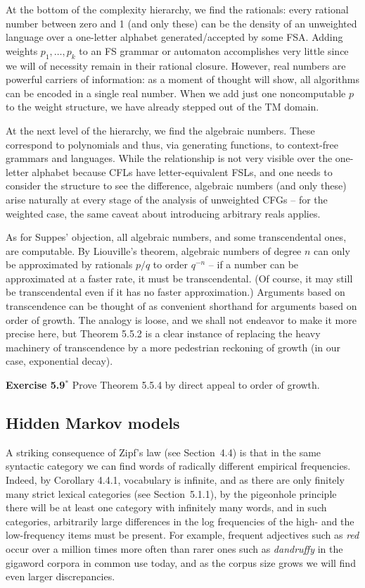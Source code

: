 At the bottom of the complexity hierarchy, we find the rationals: every
rational number between zero and 1 (and only these) can be the density of an
unweighted language over a one-letter alphabet generated/accepted by some
FSA. Adding weights $p_1, \ldots, p_k$ to an FS grammar or automaton
accomplishes very little since we will of necessity remain in their rational
closure. However, real numbers are powerful carriers of information: as a
moment of thought will show, all algorithms can be encoded in a single real
number. When we add just one noncomputable $p$ to the weight structure, we
have already stepped out of the TM domain.

At the next level of the hierarchy, we find the algebraic numbers. These
correspond to polynomials and thus, via generating functions, to context-free
grammars and languages. While the relationship is not very visible over the
one-letter alphabet because CFLs have letter-equivalent FSLs, and one needs
to consider the structure to see the difference, algebraic numbers (and only
these) arise naturally at every stage of the analysis of unweighted CFGs --
for the weighted case, the same caveat about introducing arbitrary reals
applies. 

As for Suppes' objection, all algebraic numbers, and some transcendental ones,
are computable. By Liouville's theorem, algebraic numbers of degree $n$ can
only be approximated by rationals $p/q$ to order $q^{-n}$ -- if a number can
be approximated at a faster rate, it must be transcendental. (Of course, it may
still be transcendental even if it has no faster approximation.) Arguments
based on transcendence can be thought of as convenient shorthand for arguments
based on order of growth. The analogy is loose, and we shall not endeavor to
make it more precise here, but Theorem 5.5.2 is a clear instance of replacing
the heavy machinery of transcendence by a more pedestrian reckoning of growth
(in our case, exponential decay).

\smallskip
\noindent
{\bf Exercise 5.9$^*$} Prove Theorem 5.5.4 by direct appeal to order of growth.

\subsection{Hidden Markov models}

A striking consequence of Zipf's law (see Section~4.4) is that in the same
syntactic category we can find words of radically different empirical
frequencies.  Indeed, by Corollary 4.4.1, vocabulary is infinite, and as there
are only finitely many strict lexical categories (see Section~5.1.1), by the
pigeonhole principle there will be at least one category with infinitely many
words, and in such categories, arbitrarily large differences in the log
frequencies of the high- and the low-frequency items must be present. For
example, frequent adjectives such as {\it red} occur over a million times more
often than rarer ones such as {\it dandruffy} in the gigaword corpora in
common use today, and as the corpus size grows we will find even larger
discrepancies.

